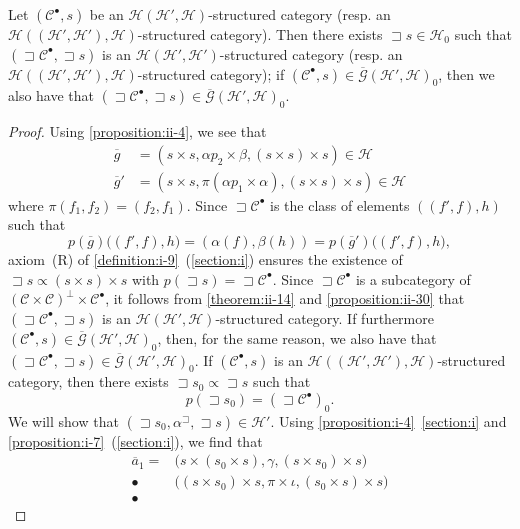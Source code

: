 \documentclass[a4paper,fleqn]{article}
\theoremstyle{plain}
\newenvironment{theorem}[1]
  {\renewcommand\theinnertheorem{#1}\innertheorem}
  {\endinnertheorem}
\theoremstyle{definition}
\newcommand{\oldpage}[1]{{\marginpar{\footnotesize$\bigg\vert$\,\,\,\,\textit{p.~#1}}}}
\newcommand{\CC}{\mathcal{C}}
\newcommand{\HH}{\mathcal{H}}
\newcommand{\subs}{\mathrel{\propto}}
\newcommand{\GG}{\mathcal{G}}
\DeclareMathOperator{\trio}{\sqsupset}
\begin{document}
\begin{theorem}{17}
\label{theorem:ii-17}
  Let $(\CC^\bullet,s)$ be an $\HH(\HH',\HH)$-structured category (resp. an $\HH((\HH',\HH'),\HH)$-structured category).
  Then there exists $\trio s\in\HH_0$ such that $(\trio\CC^\bullet,\trio s)$ is an $\HH(\HH',\HH')$-structured category (resp. an $\HH((\HH',\HH'),\HH)$-structured category);
  if $(\CC^\bullet,s)\in\overline{\GG}(\HH',\HH)_0$, then we also have that $(\trio\CC^\bullet,\trio s)\in\overline{\GG}(\HH',\HH)_0$.
\end{theorem}

\begin{proof}
  Using \cref{proposition:ii-4}, we see that
  \[
    \begin{aligned}
      \overline{g}
      &= (s\times s,\alpha p_2\times\beta, (s\times s)\times s)
      \in\HH
    \\\overline{g}'
      &= (s\times s,\pi(\alpha p_1\times\alpha), (s\times s)\times s)
      \in\HH
    \end{aligned}
  \]
  where $\pi(f_1,f_2)=(f_2,f_1)$.
  Since $\trio\CC^\bullet$ is the class of elements $((f',f),h)$ such that
  \[
    p(\overline{g})\big((f',f),h\big)
    = (\alpha(f),\beta(h))
    = p(\overline{g}')\big((f',f),h\big),
  \]
  \oldpage{424}
  axiom~(R) of \cref{definition:i-9}~(\cref{section:i}) ensures the existence of $\trio s\subs(s\times s)\times s$ with $p(\trio s)=\trio\CC^\bullet$.
  Since $\trio\CC^\bullet$ is a subcategory of $(\CC\times\CC)^\perp\times\CC^\bullet$, it follows from \cref{theorem:ii-14} and \cref{proposition:ii-30} that $(\trio\CC^\bullet,\trio s)$ is an $\HH(\HH',\HH)$-structured category.
  If furthermore $(\CC^\bullet,s)\in\overline{\GG}(\HH',\HH)_0$, then, for the same reason, we also have that $(\trio\CC^\bullet,\trio s)\in\overline{\GG}(\HH',\HH)_0$.
  If $(\CC^\bullet,s)$ is an $\HH((\HH',\HH'),\HH)$-structured category, then there exists $\trio s_0\subs\trio s$ such that
  \[
    p(\trio s_0)
    = (\trio\CC^\bullet)_0.
  \]
  We will show that $(\trio s_0,\alpha^{\trio},\trio s)\in\HH'$.
  Using \cref{proposition:i-4}~\cref{section:i} and \cref{proposition:i-7}~(\cref{section:i}), we find that
  \[
    \begin{aligned}
      \overline{a}_1
      = &\big(
        s\times(s_0\times s),
        \gamma,
        (s\times s_0)\times s
      \big)
    \\\bullet
      &\big(
        (s\times s_0)\times s,
        \pi\times\iota,
        (s_0\times s)\times s
      \big)
    \\\bullet

\end{aligned}\]
\end{proof}
\end{document}
